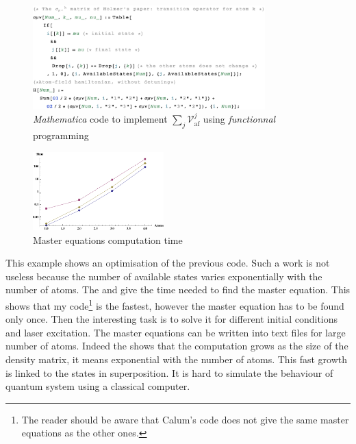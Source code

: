 \documentclass[twoside, open=right
]{scrreprt}
\newcommand{\mat}{\emph{Mathematica}\xspace}
\newcommand{\mc}[1]{\mathcal{#1}}
\begin{document}
\begin{figure}[h]
  \centering
  \includegraphics[width=0.8\textwidth]{MathematicaSampleCode.pdf}
  \caption{\label{Mathematica-code}\mat code to implement $\sum_j \mc{V}_{\mathrm{af}}^j$ using \emph{functionnal} programming}
\end{figure}

\begin{figure}
  \vspace{-10pt}
  \centering
  \includegraphics[width=0.45\textwidth]{benchmark.pdf}
  \caption{\label{benchmark-plot}Master equations computation time}
  \vspace{-20pt}
\end{figure}


\par This example shows an optimisation of the previous code. Such a work is not useless because the number of available states varies exponentially with the number of atoms. The  and  give the time needed to find the master equation. This shows that my code\footnote{The reader should be aware that Calum's code does not give the same master equations as the other ones.} is the fastest, however the master equation has to be found only once. Then the interesting task is to solve it for different initial conditions and laser excitation. The master equations can be written into text files for large number of atoms. Indeed the  shows that the computation grows as the size of the density matrix, it means exponential with the number of atoms. This fast growth is linked to the states in superposition. It is hard to simulate the behaviour of quantum system using a classical computer.
\end{document}
